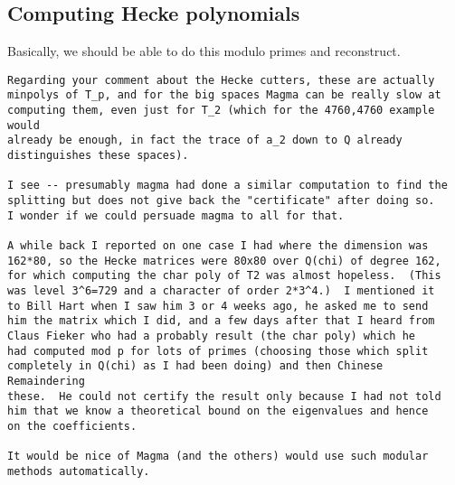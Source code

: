\documentclass[11pt]{amsart}
\numberwithin{equation}{subsection}
\theoremstyle{plain}
\theoremstyle{definition}
\begin{document}
\subsection{Computing Hecke polynomials}

Basically, we should be able to do this modulo primes and reconstruct.

\begin{verbatim}
Regarding your comment about the Hecke cutters, these are actually 
minpolys of T_p, and for the big spaces Magma can be really slow at 
computing them, even just for T_2 (which for the 4760,4760 example would 
already be enough, in fact the trace of a_2 down to Q already 
distinguishes these spaces).

I see -- presumably magma had done a similar computation to find the 
splitting but does not give back the "certificate" after doing so.  
I wonder if we could persuade magma to all for that.

A while back I reported on one case I had where the dimension was 
162*80, so the Hecke matrices were 80x80 over Q(chi) of degree 162, 
for which computing the char poly of T2 was almost hopeless.  (This 
was level 3^6=729 and a character of order 2*3^4.)  I mentioned it 
to Bill Hart when I saw him 3 or 4 weeks ago, he asked me to send 
him the matrix which I did, and a few days after that I heard from 
Claus Fieker who had a probably result (the char poly) which he 
had computed mod p for lots of primes (choosing those which split 
completely in Q(chi) as I had been doing) and then Chinese Remaindering 
these.  He could not certify the result only because I had not told 
him that we know a theoretical bound on the eigenvalues and hence 
on the coefficients.

It would be nice of Magma (and the others) would use such modular 
methods automatically.
\end{verbatim}
\end{document}

